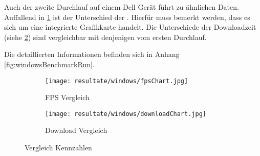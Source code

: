 Auch der zweite Durchlauf auf einem Dell Gerät führt zu ähnlichen Daten. Auffallend in \ref{fig:benchmarkFpsChartWindows} ist der Unterschied der . Hierfür muss bemerkt werden, dass es sich um eine integrierte Grafikkarte handelt. Die Unterschiede der Downloadzeit (siehe \ref{fig:benchmarkDownloadChartWindows}) sind vergleichbar mit denjenigen vom ersten Durchlauf.

Die detaillierten Informationen befinden sich in Anhang \ref{fig:windowsBenchmarkRun}.

\begin{figure}[H]
  \centering
  \begin{subfigure}{.49\textwidth}
    \centering
    \texttt{[image: resultate/windows/fpsChart.jpg]}
    \caption{FPS Vergleich}
    \label{fig:benchmarkFpsChartWindows}
  \end{subfigure}
  \begin{subfigure}{.49\textwidth}
    \centering
    \texttt{[image: resultate/windows/downloadChart.jpg]}
    \caption{Download Vergleich}
    \label{fig:benchmarkDownloadChartWindows}
  \end{subfigure}
  \caption{Vergleich Kennzahlen}
  \label{fig:benchmarkChartWindows}
\end{figure}
